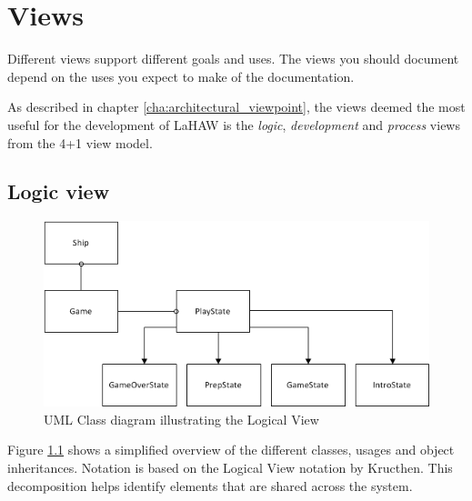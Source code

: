 \chapter{Views}


Different views support different goals and uses.
The views you should document depend on the uses you expect to make of the documentation.



As described in chapter \ref{cha:architectural_viewpoint}, the views deemed the most useful for the development of LaHAW is the \emph{logic}, \emph{development} and \emph{process} views from the 4+1 view model.
 






\section{Logic view}


\begin{figure}[ht]
    \includegraphics[width=\textwidth]{LogicalView.png}
    \caption{UML Class diagram illustrating the Logical View}
    \label{fig:LogicalView}
\end{figure}

Figure \ref{fig:LogicalView} shows a simplified overview of the different classes, usages and object inheritances. Notation is based on the Logical View notation by Kructhen\cite{kruchten}. This decomposition helps identify elements that are shared across the system.

